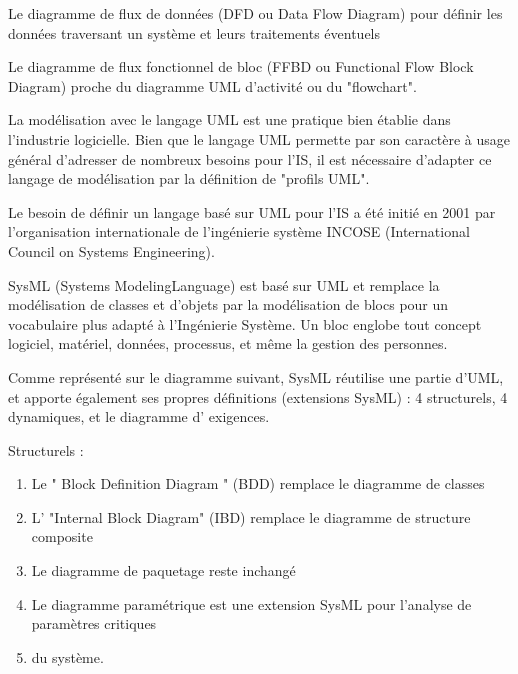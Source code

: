 \documentclass[12pt,a4paper]{report}
\begin{document}
	\noindent Le diagramme de flux de donn\'{e}es (DFD ou Data Flow Diagram) pour d\'{e}finir les donn\'{e}es traversant un syst\`{e}me et leurs traitements \'{e}ventuels
	
	\noindent Le diagramme de flux fonctionnel de bloc (FFBD ou Functional Flow Block Diagram) proche du diagramme UML d'activit\'{e} ou du "flowchart". 
	
	\noindent  La mod\'{e}lisation avec le langage UML est une pratique bien \'{e}tablie dans l'industrie logicielle. Bien que le langage UML permette par son caract\`{e}re \`{a} usage g\'{e}n\'{e}ral d'adresser de nombreux besoins pour l'IS, il est n\'{e}cessaire d'adapter ce langage de mod\'{e}lisation par la d\'{e}finition de  "profils UML".
	
	\noindent Le besoin de d\'{e}finir un langage bas\'{e} sur UML pour l'IS a \'{e}t\'{e} initi\'{e} en 2001 par l'organisation internationale de l'ing\'{e}nierie syst\`{e}me INCOSE (International Council on Systems Engineering).
	
	\noindent SysML (Systems ModelingLanguage) est bas\'{e} sur UML et remplace la mod\'{e}lisation de classes et d'objets par la mod\'{e}lisation de blocs pour un vocabulaire plus adapt\'{e} \`{a} l'Ing\'{e}nierie Syst\`{e}me. Un bloc englobe tout concept logiciel, mat\'{e}riel, donn\'{e}es, processus, et m\^{e}me la gestion des personnes.
	
	\noindent Comme repr\'{e}sent\'{e} sur le diagramme suivant, SysML r\'{e}utilise une partie d'UML, et apporte \'{e}galement ses propres d\'{e}finitions (extensions SysML) : 4 structurels, 4 dynamiques, et le diagramme d' exigences.
	
	\noindent Structurels :


\begin{enumerate}
	\item  Le " Block Definition Diagram " (BDD) remplace le diagramme de classes
	
	\item  L' "Internal Block Diagram" (IBD) remplace le diagramme de structure composite
	
	\item  Le diagramme de paquetage reste inchang\'{e}
	
	\item  Le diagramme param\'{e}trique est une extension SysML pour l'analyse de param\`{e}tres critiques
	
	\item  du syst\`{e}me.
\end{enumerate}
\end{document}
